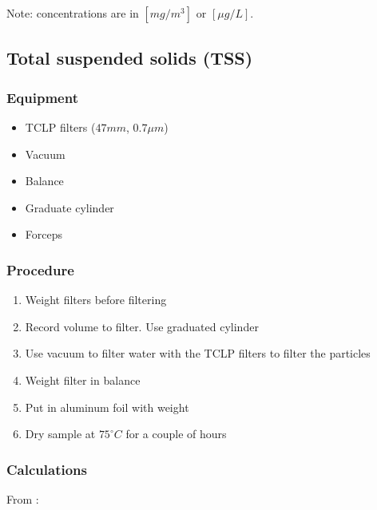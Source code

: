 \begin{appendices}
Note: concentrations are in $[mg/m^3]$ or $[\mu g/L]$.


\subsection{Total suspended solids (TSS)}

\subsubsection{Equipment}
\begin{itemize}[itemsep=2pt,parsep=2pt]

  \item TCLP filters ($47 mm$, $0.7\mu m$)
  \item Vacuum
  \item Balance
  \item Graduate cylinder
  \item Forceps

\end{itemize}

\subsubsection{Procedure}
\begin{enumerate}[itemsep=2pt,parsep=2pt]
  \item Weight filters before filtering
  \item Record volume to filter. Use graduated cylinder
  \item Use vacuum to filter water with the TCLP filters to filter the particles
  \item Weight filter in balance
  \item Put in aluminum foil with weight
  \item Dry sample at $75^\circ C$ for a couple of hours
\end{enumerate}

\subsubsection{Calculations}
From \cite{Tyler2013_SPM_protocol}:


\end{appendices}
